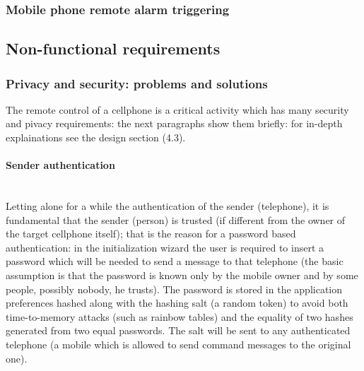 \documentclass[a4paper,12pt]{article}
\begin{document}
\subsubsection{Mobile phone remote alarm triggering}
\subsection{Non-functional requirements}
\subsubsection{Privacy and security: problems and solutions}
\small{The remote control of a cellphone is a critical activity which has many security and pivacy requirements: the next paragraphs show them briefly: for in-depth explainations see the design section (4.3).}
\vspace{10pt}
\paragraph{Sender authentication} \hspace{0pt} \\
\small{Letting alone for a while the authentication of the sender (telephone), it is fundamental that the sender (person) is trusted (if different from the owner of the target cellphone itself); that is the reason for a password based authentication: in the initialization wizard the user is required to insert a password which will be needed to send a message to that telephone (the basic assumption is that the password is known only by the mobile owner and by some people, possibly nobody, he trusts). The password is stored in the application preferences hashed along with the hashing salt (a random token) to avoid both time-to-memory attacks (such as rainbow tables) and the equality of two hashes generated from two equal passwords. The salt will be sent to any authenticated telephone (a mobile which is allowed to send command messages to the original one).}
\end{document}
